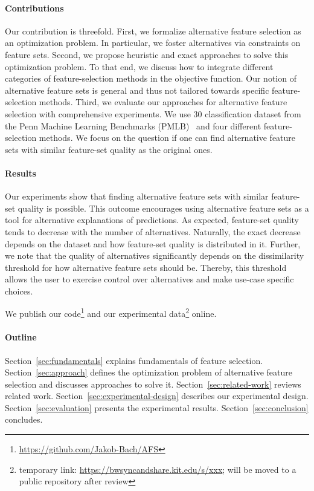 \documentclass[conference]{IEEEtran}
\theoremstyle{definition}
\begin{document}
\paragraph{Contributions}

Our contribution is threefold.
First, we formalize alternative feature selection as an optimization problem.
In particular, we foster alternatives via constraints on feature sets.
Second, we propose heuristic and exact approaches to solve this optimization problem.
To that end, we discuss how to integrate different categories of feature-selection methods in the objective function.
Our notion of alternative feature sets is general and thus not tailored towards specific feature-selection methods.
Third, we evaluate our approaches for alternative feature selection with comprehensive experiments.
We use 30 classification dataset from the Penn Machine Learning Benchmarks (PMLB)~\cite{olson2017pmlb, romano2021pmlb} and four different feature-selection methods.
We focus on the question if one can find alternative feature sets with similar feature-set quality as the original ones.

\paragraph{Results}

Our experiments show that finding alternative feature sets with similar feature-set quality is possible.
This outcome encourages using alternative feature sets as a tool for alternative explanations of predictions.
As expected, feature-set quality tends to decrease with the number of alternatives.
Naturally, the exact decrease depends on the dataset and how feature-set quality is distributed in it.
Further, we note that the quality of alternatives significantly depends on the dissimilarity threshold for how alternative feature sets should be.
Thereby, this threshold allows the user to exercise control over alternatives and make use-case specific choices.

We publish our code\footnote{\url{https://github.com/Jakob-Bach/AFS}} and our experimental data\footnote{temporary link: \url{https://bwsyncandshare.kit.edu/s/xxx}; will be moved to a public repository after review} online.

\paragraph{Outline}

Section~\ref{sec:fundamentals} explains fundamentals of feature selection.
Section~\ref{sec:approach} defines the optimization problem of alternative feature selection and discusses approaches to solve it.
Section~\ref{sec:related-work} reviews related work.
Section~\ref{sec:experimental-design} describes our experimental design.
Section~\ref{sec:evaluation} presents the experimental results.
Section~\ref{sec:conclusion} concludes.
\end{document}
